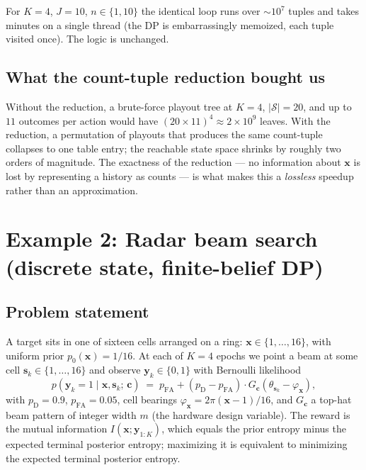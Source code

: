 \documentclass[11pt]{article}
\newcommand{\bc}{\bm{c}}
\newcommand{\bx}{\bm{x}}
\newcommand{\by}{\bm{y}}
\newcommand{\bs}{\bm{s}}
\begin{document}
For $K = 4$, $J = 10$, $n \in \{1, 10\}$ the identical loop runs over $\sim 10^7$ tuples and takes minutes on a single thread (the DP is embarrassingly memoized, each tuple visited once).  The logic is unchanged.

\subsection{What the count-tuple reduction bought us}

Without the reduction, a brute-force playout tree at $K = 4$, $|\mathcal{S}| = 20$, and up to $11$ outcomes per action would have $(20 \times 11)^4 \approx 2 \times 10^9$ leaves.  With the reduction, a permutation of playouts that produces the same count-tuple collapses to one table entry; the reachable state space shrinks by roughly two orders of magnitude.  The exactness of the reduction --- no information about $\bx$ is lost by representing a history as counts --- is what makes this a \emph{lossless} speedup rather than an approximation.

\section{Example 2: Radar beam search (discrete state, finite-belief DP)}
\label{sec:radar}

\subsection{Problem statement}

A target sits in one of sixteen cells arranged on a ring: $\bx \in \{1, \ldots, 16\}$, with uniform prior $p_0(\bx) = 1/16$.  At each of $K = 4$ epochs we point a beam at some cell $\bs_k \in \{1, \ldots, 16\}$ and observe $\by_k \in \{0, 1\}$ with Bernoulli likelihood
\begin{equation}
p(\by_k = 1 \mid \bx, \bs_k;\, \bc) \;=\; p_\mathrm{FA} + (p_\mathrm{D} - p_\mathrm{FA}) \cdot G_{\bc}(\theta_{\bs_k} - \varphi_{\bx}),
\label{eq:radar_likelihood}
\end{equation}
with $p_\mathrm{D} = 0.9$, $p_\mathrm{FA} = 0.05$, cell bearings $\varphi_{\bx} = 2\pi(\bx - 1)/16$, and $G_{\bc}$ a top-hat beam pattern of integer width $m$ (the hardware design variable).  The reward is the mutual information $I(\bx; \by_{1:K})$, which equals the prior entropy minus the expected terminal posterior entropy; maximizing it is equivalent to minimizing the expected terminal posterior entropy.
\end{document}
